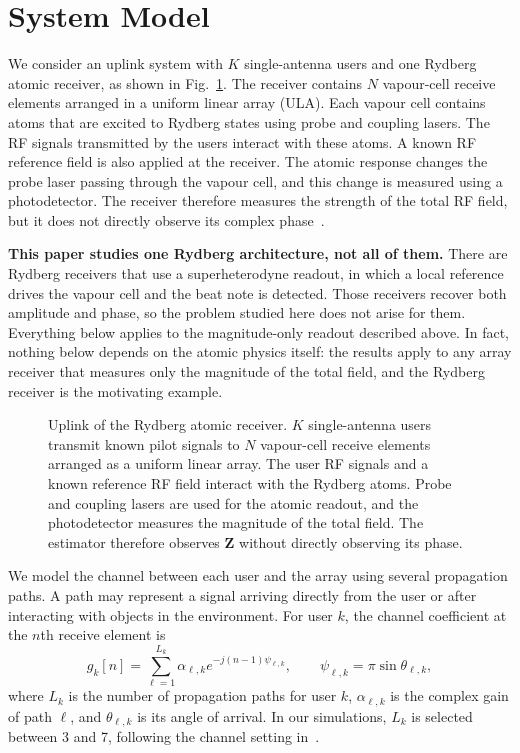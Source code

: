 \documentclass[journal]{IEEEtran}
\newcommand{\bZ}{\mathbf{Z}}
\begin{document}
\section{System Model}

We consider an uplink system with $K$ single-antenna users and one Rydberg
atomic receiver, as shown in Fig.~\ref{fig:system}. The receiver contains $N$
vapour-cell receive elements arranged in a uniform linear array (ULA). Each
vapour cell contains atoms that are excited to Rydberg states using probe and
coupling lasers. The RF signals transmitted by the users interact with these
atoms. A known RF reference field is also applied at the receiver. The atomic
response changes the probe laser passing through the vapour cell, and this
change is measured using a photodetector. The receiver therefore measures the
strength of the total RF field, but it does not directly observe its complex
phase~\cite{cui2025}.

\textbf{This paper studies one Rydberg architecture, not all of them.} There
are Rydberg receivers that use a superheterodyne readout, in which a local
reference drives the vapour cell and the beat note is detected. Those receivers
recover both amplitude and phase, so the problem studied here does not arise
for them. Everything below applies to the magnitude-only readout described
above. In fact, nothing below depends on the atomic physics itself: the results
apply to any array receiver that measures only the magnitude of the total
field, and the Rydberg receiver is the motivating example.

\begin{figure}[!t]
\centering
\resizebox{0.86\textwidth}{!}{}
\caption{Uplink of the Rydberg atomic receiver. $K$ single-antenna users
transmit known pilot signals to $N$ vapour-cell receive elements arranged as a
uniform linear array. The user RF signals and a known reference RF field
interact with the Rydberg atoms. Probe and coupling lasers are used for the
atomic readout, and the photodetector measures the magnitude of the total
field. The estimator therefore observes $\bZ$ without directly observing its
phase.}
\label{fig:system}
\end{figure}

We model the channel between each user and the array using several propagation
paths. A path may represent a signal arriving directly from the user or after
interacting with objects in the environment. For user $k$, the channel
coefficient at the $n$th receive element is
\begin{equation}
g_k[n]=\sum_{\ell=1}^{L_k}\alpha_{\ell,k}e^{-j(n-1)\psi_{\ell,k}},\qquad
\psi_{\ell,k}=\pi\sin\theta_{\ell,k},
\label{eq:chan}
\end{equation}
where $L_k$ is the number of propagation paths for user $k$, $\alpha_{\ell,k}$
is the complex gain of path $\ell$, and $\theta_{\ell,k}$ is its angle of
arrival. In our simulations, $L_k$ is selected between 3 and 7, following the
channel setting in~\cite{xu2025}.
\end{document}
